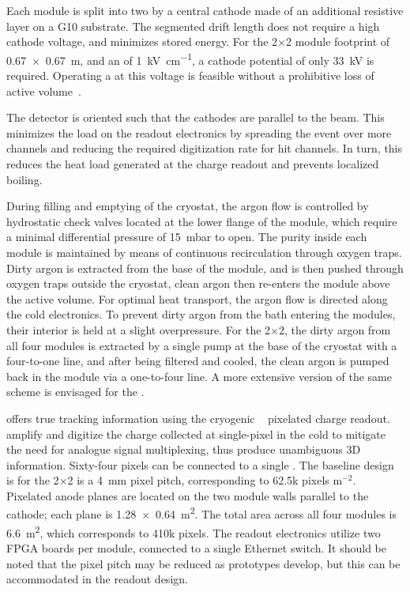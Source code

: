Each module is split into two  by a central cathode made of an additional resistive layer on a G10 substrate. The segmented drift length does not require a high cathode voltage, and minimizes stored energy. For the 2$\times$2 module footprint of \SI{0.67 x 0.67}{\metre}, and an \efield of \SI{1}{\kilo\volt\per\centi\metre}, a cathode potential of only \SI{33}{\kilo\volt} is required. Operating a  at this voltage is feasible without a prohibitive loss of active volume~\cite{Zeller:2013sva}.

The detector is oriented such that the cathodes are parallel to the beam. This minimizes the load on the readout electronics by spreading the event over more channels and reducing the required digitization rate for hit channels. In turn, this reduces the heat load generated at the charge readout and prevents localized boiling.

During filling and emptying of the cryostat, the argon flow is controlled by hydrostatic check valves located at the lower flange of the module, which require a minimal differential pressure of \SI{15}{\milli\bar} to open. The purity inside each module is maintained by means of continuous  recirculation through oxygen traps. Dirty argon is extracted from the base of the module, and is then pushed through oxygen traps outside the cryostat, clean argon then re-enters the module above the active volume. For optimal heat transport, the argon flow is directed along the cold electronics. To prevent dirty argon from the bath entering the modules, their interior is held at a slight overpressure. For the 2$\times$2, the dirty argon from all four modules is extracted by a single pump at the base of the cryostat with a four-to-one line, and after being filtered and cooled, the clean argon is pumped back in the module via a one-to-four line.
A more extensive version of the same scheme is envisaged for the  .  


 offers true \threed tracking information using the  cryogenic ~\cite{larpix} pixelated charge readout.   amplify and digitize the charge collected at single-pixel in the cold to mitigate the need for analogue signal multiplexing, thus produce unambiguous 3D information. Sixty-four pixels can be connected to a single  . The baseline design is for the 2$\times$2 is a \SI{4}{\milli\metre} pixel pitch, corresponding to 62.5k pixels m$^{-2}$. Pixelated anode planes are located on the two module walls parallel to the cathode; each plane is \SI[product-units=repeat]{1.28x0.64}{\metre\squared}. The total area across all four modules is \SI{6.6}{\metre\squared}, which corresponds to 410k pixels. The readout electronics utilize two FPGA boards per module, connected to a single Ethernet switch. It should be noted that the pixel pitch may be reduced as prototypes develop, but this can be accommodated in the readout design. 

